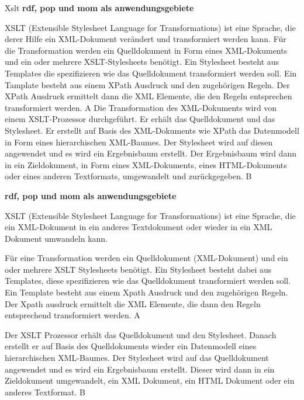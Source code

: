 

Xslt
\textbf{rdf, pop und mom als anwendungsgebiete}

XSLT (Extensible Stylesheet Language for Transformations) ist eine Sprache, die derer Hilfe ein XML-Dokument verändert und transformiert werden kann. 
Für die Transformation werden ein Quelldokument in Form eines XML-Dokuments und ein oder mehrere XSLT-Stylesheets benötigt. Ein Stylesheet besteht aus Templates die spezifizieren wie das Quelldokument transformiert werden soll. Ein Tamplate besteht aus einem XPath Ausdruck und den zugehörigen Regeln. Der XPath Ausdruck ermittelt dann die XML Elemente, die den Regeln entsprechen transformiert werden. A
Die Transformation des XML-Dokuments wird von einem XSLT-Prozessor durchgeführt. Er erhält das Quelldokument und das Stylesheet. Er erstellt auf Basis des XML-Dokuments wie XPath das Datenmodell in Form eines hierarchischen XML-Baumes. Der Stylesheet wird auf diesen angewendet und es wird ein Ergebnisbaum erstellt. Der Ergebnisbaum wird dann in ein Zieldokument, in Form eines XML-Dokuments, eines HTML-Dokuments oder eines anderen Textformats, umgewandelt und zurückgegeben. B




\textbf{rdf, pop und mom als anwendungsgebiete}

XSLT (Extensible Stylesheet Language for Transformations) ist eine Sprache, die ein XML-Dokument in ein anderes Textdokument oder wieder in ein XML Dokument umwandeln kann.

Für eine Transformation werden ein Quelldokument (XML-Dokument) und ein oder mehrere XSLT Stylesheets benötigt. Ein Stylesheet besteht dabei aus Templates, diese spezifizieren wie das Quelldokument transformiert werden soll. Ein Template besteht aus einem Xpath Ausdruck und den zugehörigen Regeln. Der Xpath ausdruck ermittelt die XML Elemente, die dann den Regeln entsprechend transformiert werden. A

Der XSLT Prozessor erhält das Quelldokument und den Stylesheet. Danach erstellt er auf Basis des Quelldokuments wieder ein Datenmodell eines hierarchischen XML-Baumes. Der Stylesheet wird auf das Quelldokument angewendet und es wird ein Ergebnisbaum erstellt. Dieser wird dann in ein Zieldokument umgewandelt, ein XML Dokument, ein HTML Dokument oder ein anderes Textformat. B


